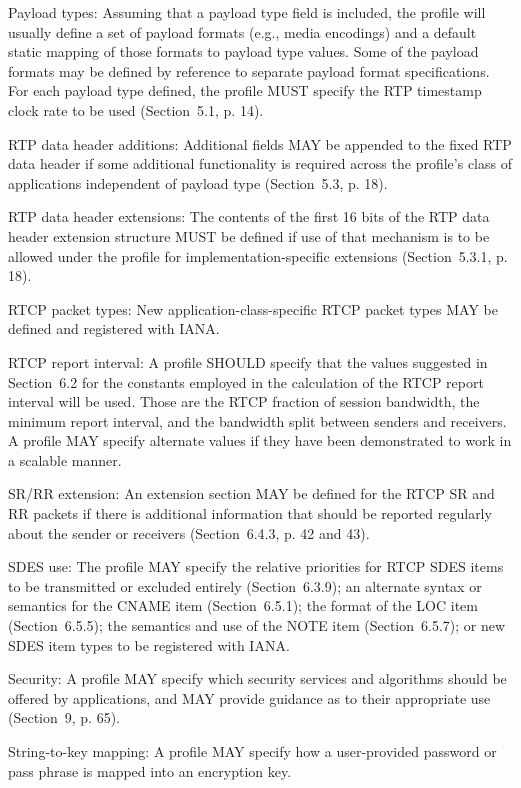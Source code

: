 \documentclass{article}
\begin{document}
Payload types: Assuming that a payload type field is included, the profile will usually define a set of payload formats (e.g., media encodings) and a default static mapping of those formats to payload type values.  Some of the payload formats may be defined by reference to separate payload format specifications.  For each payload type defined, the profile MUST specify the RTP timestamp clock rate to be used (Section~5.1, p. 14).

RTP data header additions: Additional fields MAY be appended to the fixed RTP data header if some additional functionality is required across the profile's class of applications independent of payload type (Section~5.3, p. 18).

RTP data header extensions: The contents of the first 16 bits of the RTP data header extension structure MUST be defined if use of that mechanism is to be allowed under the profile for implementation-specific extensions (Section~5.3.1, p. 18).

RTCP packet types: New application-class-specific RTCP packet types MAY be defined and registered with IANA.

RTCP report interval: A profile SHOULD specify that the values suggested in Section~6.2 for the constants employed in the calculation of the RTCP report interval will be used.  Those are the RTCP fraction of session bandwidth, the minimum report interval, and the bandwidth split between senders and receivers. A profile MAY specify alternate values if they have been demonstrated to work in a scalable manner.

SR/RR extension: An extension section MAY be defined for the RTCP SR and RR packets if there is additional information that should be reported regularly about the sender or receivers (Section~6.4.3, p. 42 and 43).

SDES use: The profile MAY specify the relative priorities for RTCP SDES items to be transmitted or excluded entirely (Section~6.3.9); an alternate syntax or semantics for the CNAME item (Section~6.5.1); the format of the LOC item (Section~6.5.5); the semantics and use of the NOTE item (Section~6.5.7); or new SDES item types to be registered with IANA.

Security: A profile MAY specify which security services and algorithms should be offered by applications, and MAY provide guidance as to their appropriate use (Section~9, p. 65).

String-to-key mapping: A profile MAY specify how a user-provided password or pass phrase is mapped into an encryption key.
\end{document}
